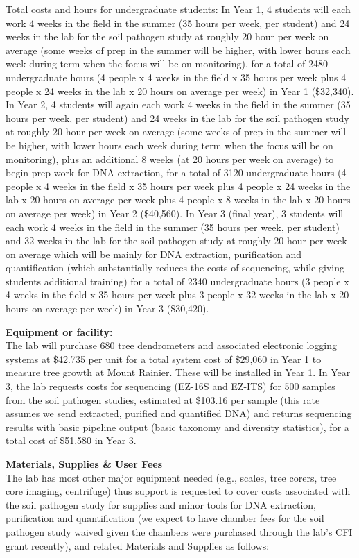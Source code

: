 \documentclass[12pt,oneside]{article}
\begin{document}
Total costs and hours for undergraduate students: In Year 1, 4 students will each work 4 weeks in the field in the summer  (35 hours per week, per student) and 24 weeks in the lab for the soil pathogen study at roughly 20 hour per week on average (some weeks of prep in the summer will be higher, with lower hours each week during term when the focus will be on monitoring), for a total of 2480 undergraduate hours (4 people x 4 weeks in the field x 35 hours per week plus 4 people x 24 weeks in the lab x 20 hours on average per week) in Year 1 (\$32,340). In Year 2, 4 students will again each work 4 weeks in the field in the summer  (35 hours per week, per student) and 24 weeks in the lab for the soil pathogen study at roughly 20 hour per week on average (some weeks of prep in the summer will be higher, with lower hours each week during term when the focus will be on monitoring), plus an additional 8 weeks (at 20 hours per week on average) to begin prep work for DNA extraction, for a total of 3120 undergraduate hours (4 people x 4 weeks in the field x 35 hours per week plus 4 people x 24 weeks in the lab x 20 hours on average per week plus 4 people x 8 weeks in the lab x 20 hours on average per week) in Year 2 (\$40,560). In Year 3 (final year), 3 students will each work 4 weeks in the field in the summer  (35 hours per week, per student) and 32 weeks in the lab for the soil pathogen study at roughly 20 hour per week on average which will be mainly for DNA extraction, purification and quantification (which substantially reduces the costs of sequencing, while giving students additional training) for a total of 2340 undergraduate hours (3 people x 4 weeks in the field x 35 hours per week plus 3 people x 32 weeks in the lab x 20 hours on average per week) in Year 3 (\$30,420). 

{\bf Equipment or facility:}\\
The lab will purchase 680 tree dendrometers and associated electronic logging systems at \$42.735 per unit for a total system cost of \$29,060 in Year 1 to measure tree growth at Mount Rainier. These will be installed in Year 1. In Year 3, the lab requests costs for sequencing (EZ-16S and EZ-ITS) for 500 samples from the soil pathogen studies, estimated at \$103.16 per sample (this rate assumes we send extracted, purified and quantified DNA) and returns sequencing results with basic pipeline output (basic taxonomy and diversity statistics), for a total cost of \$51,580 in Year 3.  

{\bf Materials, Supplies \& User Fees}\\
The lab has most other major equipment needed (e.g., scales, tree corers, tree core imaging, centrifuge) thus support is requested to cover costs associated with the soil pathogen study for supplies and minor tools for DNA extraction, purification and quantification (we expect to have chamber fees for the soil pathogen study waived given the chambers were purchased through the lab's CFI grant recently), and related Materials and Supplies as follows:
\end{document}
